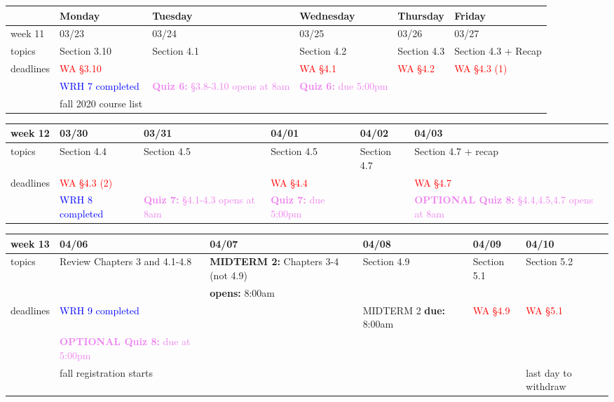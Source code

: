 \documentclass[11pt]{article}
\begin{document}
  
\begin{center}
\begin{tabularx}{\textwidth}{|p{1.5cm}|| L | L | L | L | L |}
\hline
&Monday & Tuesday & Wednesday & Thursday & Friday \\
\hline 
week 11&03/23&03/24&03/25&03/26&03/27\\ \hline
topics&Section 3.10&Section 4.1&Section 4.2&Section 4.3&Section 4.3 + Recap\\ 
\hline
deadlines&\textcolor{red}{WA \S 3.10}&&\textcolor{red}{WA \S 4.1}&\textcolor{red}{ WA \S 4.2}& \textcolor{red}{WA \S 4.3 (1)}\\
&\textcolor{blue}{WRH 7 completed}&\textcolor{violet}{\textbf{Quiz 6:} \S3.8-3.10 opens at 8am }&\textcolor{violet}{\textbf{Quiz 6:} due 5:00pm }&&\\
&\textcolor{ddgreen}{fall 2020 course list}&&&& \\
\hline
\end{tabularx} \end{center}

\begin{center}
\begin{tabularx}{\textwidth}{|p{1.5cm}|| L | L | L | L | L |}
\hline
{}
week 12&03/30&03/31&04/01&04/02&04/03\\ \hline
topics&Section 4.4&Section 4.5&Section 4.5&Section 4.7&Section 4.7 + recap\\ 
\hline
deadlines& \textcolor{red}{WA \S 4.3 (2)}&&\textcolor{red}{WA \S 4.4}&&\textcolor{red}{WA \S 4.7}\\
&\textcolor{blue}{WRH 8 completed}&\textcolor{violet}{\textbf{Quiz 7:} \S4.1-4.3 opens at 8am } &\textcolor{violet}{\textbf{Quiz 7:} due 5:00pm}&&\textcolor{violet}{\textbf{OPTIONAL Quiz 8:} \S4.4,4.5,4.7 opens at 8am }\\ \hline
\end{tabularx} \end{center}

\begin{center}
\begin{tabularx}{\textwidth}{|p{1.5cm}|| L | L | L | L | L |}
\hline
week 13&04/06&04/07&04/08&04/09&04/10\\ \hline
topics &Review Chapters 3 and 4.1-4.8&\textcolor{dcyan}{\textbf{MIDTERM 2: }} Chapters 3-4 (not 4.9)&Section 4.9&Section 5.1&Section 5.2\\ 
&&\textcolor{dcyan}{\textbf{opens:} 8:00am}&&&\\ \hline

deadlines&\textcolor{blue}{WRH 9 completed} && \textcolor{dcyan}{MIDTERM 2  \textbf{due:} 8:00am}&\textcolor{red}{WA \S 4.9}&\textcolor{red}{WA \S 5.1}\\
&\textcolor{violet}{\textbf{OPTIONAL Quiz 8:} due at 5:00pm }&&&&\\
&\textcolor{ddgreen}{fall registration starts} &&&&\textcolor{ddgreen}{last day to withdraw} \\ \hline \end{tabularx} \end{center}
\end{document}
